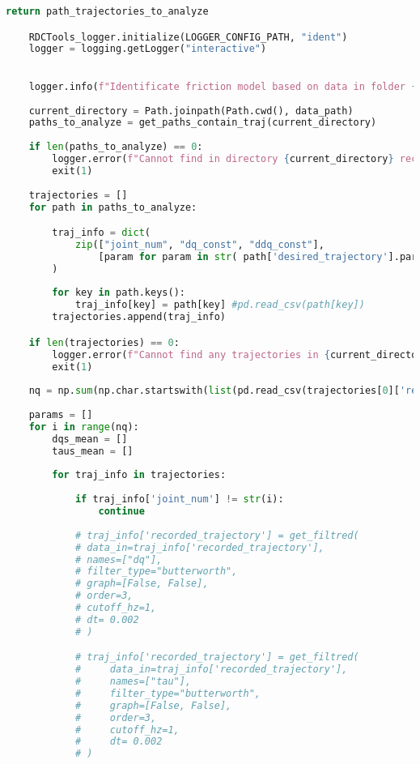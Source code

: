 \begin{lstlisting}[language=python, caption=\raggedright{identification/friction.py}, frame=single]
        return path_trajectories_to_analyze

    RDCTools_logger.initialize(LOGGER_CONFIG_PATH, "ident")
    logger = logging.getLogger("interactive")
    

    logger.info(f"Identificate friction model based on data in folder {data_path}")
   
    current_directory = Path.joinpath(Path.cwd(), data_path)
    paths_to_analyze = get_paths_contain_traj(current_directory)
    
    if len(paths_to_analyze) == 0:
        logger.error(f"Cannot find in directory {current_directory} recursively recoded_trajectory.csv")
        exit(1)
   
    trajectories = []
    for path in paths_to_analyze:

        traj_info = dict(
            zip(["joint_num", "dq_const", "ddq_const"], 
                [param for param in str( path['desired_trajectory'].parent.name).split('_')[1:]]) 
        )
        
        for key in path.keys():
            traj_info[key] = path[key] #pd.read_csv(path[key])
        trajectories.append(traj_info)

    if len(trajectories) == 0:
        logger.error(f"Cannot find any trajectories in {current_directory}")
        exit(1)
        
    nq = np.sum(np.char.startswith(list(pd.read_csv(trajectories[0]['recorded_trajectory']).columns), 'q_')) 
    
    params = []
    for i in range(nq):
        dqs_mean = []
        taus_mean = []
        
        for traj_info in trajectories:
          
            if traj_info['joint_num'] != str(i):
                continue
            
            # traj_info['recorded_trajectory'] = get_filtred(
            # data_in=traj_info['recorded_trajectory'],
            # names=["dq"],
            # filter_type="butterworth",
            # graph=[False, False],
            # order=3,
            # cutoff_hz=1,
            # dt= 0.002
            # )

            # traj_info['recorded_trajectory'] = get_filtred(
            #     data_in=traj_info['recorded_trajectory'],
            #     names=["tau"],
            #     filter_type="butterworth",
            #     graph=[False, False],
            #     order=3,
            #     cutoff_hz=1,
            #     dt= 0.002
            # )



\end{lstlisting}

